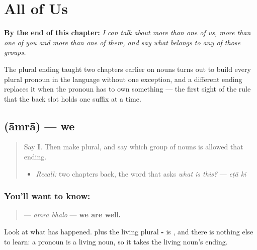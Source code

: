 
\chapter{All of Us}
\label{ch:bn-all-of-us}

\begin{chapteropening}
\textbf{By the end of this chapter:} \emph{I can talk about more than one of us, more than one of you and more than one of them, and say what belongs to any of those groups.}

The plural ending taught two chapters earlier on nouns turns out to build every plural pronoun in the language without one exception, and a different ending replaces it when the pronoun has to own something — the first sight of the rule that the back slot holds one suffix at a time.
\end{chapteropening}

\section[\texorpdfstring{\bn{আমরা} (āmrā)}{আমরা (āmrā)}]{ (āmrā) — we}

\label{lesson:BN-C24-amra}



\begin{quote}
Say \textbf{I}. Then make \textbf{} plural, and say which group of nouns is allowed that ending.

\begin{itemize}
\raggedright
  \item \emph{Recall:} two chapters back, the word that asks \emph{what is this?} — \emph{eṭā ki}
\end{itemize}
\end{quote}

\subsection*{You'll want to know: }
\begin{quote}
\textbf{ } — \emph{āmrā bhālo} — \textbf{we are well.}
\end{quote}

Look at what has happened. \textbf{} plus the living plural \textbf{-} is \textbf{}, and there is nothing else to learn: a pronoun is a living noun, so it takes the living noun's ending.


